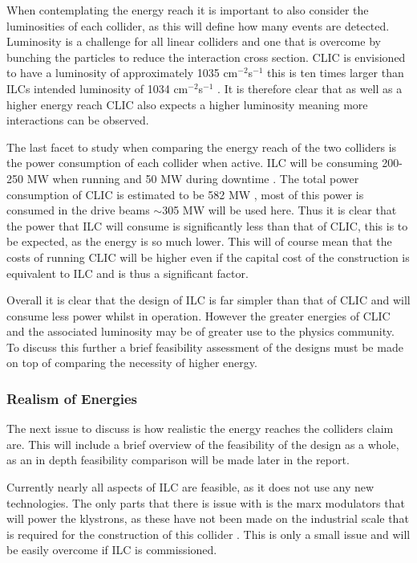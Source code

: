 When contemplating the energy reach it is important to also consider the luminosities of each collider, as this will define how many events are detected. Luminosity is a challenge for all linear colliders and one that is overcome by bunching the particles to reduce the interaction cross section. CLIC is envisioned to have a luminosity of approximately 1035 cm$^{-2}$s$^{−1}$ \cite{CLIC:Luminosity} this is ten times larger than ILCs intended luminosity of 1034 cm$^{-2}$s$^{−1}$ \cite{IOP:ILC}. It is therefore clear that as well as a higher energy reach CLIC also expects a higher luminosity meaning more interactions can be observed.

The last facet to study when comparing the energy reach of the two colliders is the power consumption of each collider when active. ILC will be consuming 200-250 MW when running and 50 MW during downtime \cite{ILC:Director}. The total power consumption of CLIC is estimated to be 582 MW \cite{CLIC:PowerConsumption}, most of this power is consumed in the drive beams $\sim$305 MW will be used here. Thus it is clear that the power that ILC will consume is significantly less than that of CLIC, this is to be expected, as the energy is so much lower. This will of course mean that the costs of running CLIC will be higher even if the capital cost of the construction is equivalent to ILC and is thus a significant factor.

Overall it is clear that the design of ILC is far simpler than that of CLIC and will consume less power whilst in operation. However the greater energies of CLIC and the associated luminosity may be of greater use to the physics community. To discuss this further a brief feasibility assessment of the designs must be made on top of comparing the necessity of higher energy.

\subsubsection{Realism of Energies}
The next issue to discuss is how realistic the energy reaches the colliders claim are. This will include a brief overview of the feasibility of the design as a whole, as an in depth feasibility comparison will be made later in the report. %

Currently nearly all aspects of ILC are feasible, as it does not use any new technologies. The only parts that there is issue with is the marx modulators that will power the klystrons, as these have not been made on the industrial scale that is required for the construction of this collider \cite{ILC:ReferenceDesignReport}. This is only a small issue and will be easily overcome if ILC is commissioned.

